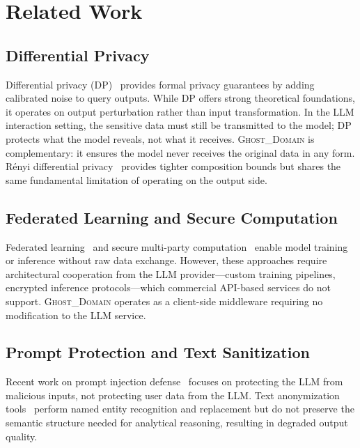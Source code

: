 \documentclass[11pt]{article}
\begin{document}
\section{Related Work}

\subsection{Differential Privacy}
Differential privacy (DP)~\cite{dwork2006calibrating} provides formal privacy guarantees by adding calibrated noise to query outputs. While DP offers strong theoretical foundations, it operates on output perturbation rather than input transformation. In the LLM interaction setting, the sensitive data must still be transmitted to the model; DP protects what the model reveals, not what it receives. \textsc{Ghost\_Domain} is complementary: it ensures the model never receives the original data in any form. R\'enyi differential privacy~\cite{mironov2017renyi} provides tighter composition bounds but shares the same fundamental limitation of operating on the output side.

\subsection{Federated Learning and Secure Computation}
Federated learning~\cite{mcmahan2017communication} and secure multi-party computation~\cite{yao1986generate} enable model training or inference without raw data exchange. However, these approaches require architectural cooperation from the LLM provider---custom training pipelines, encrypted inference protocols---which commercial API-based services do not support. \textsc{Ghost\_Domain} operates as a client-side middleware requiring no modification to the LLM service.

\subsection{Prompt Protection and Text Sanitization}
Recent work on prompt injection defense~\cite{perez2022ignore} focuses on protecting the LLM from malicious inputs, not protecting user data from the LLM. Text anonymization tools~\cite{lison2021anonymisation} perform named entity recognition and replacement but do not preserve the semantic structure needed for analytical reasoning, resulting in degraded output quality.
\end{document}
